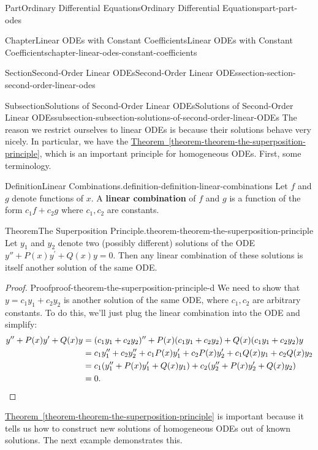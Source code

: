 \documentclass[twoside,10pt,]{book}
\newcommand{\xreffont}{\relax}
\newcommand{\terminology}[1]{\textbf{#1}}
\numberwithin{equation}{part}
\newcommand{\qedhere}{\relax}
\begin{document}
\begin{partptx}{Part}{Ordinary Differential Equations}{}{Ordinary Differential Equations}{}{}{part-part-odes}
\begin{chapterptx}{Chapter}{Linear ODEs with Constant Coefficients}{}{Linear ODEs with Constant Coefficients}{}{}{chapter-linear-odes-constant-coefficients}
\begin{sectionptx}{Section}{Second-Order Linear ODEs}{}{Second-Order Linear ODEs}{}{}{section-section-second-order-linear-odes}
\typeout{************************************************}
%
\begin{subsectionptx}{Subsection}{Solutions of Second-Order Linear ODEs}{}{Solutions of Second-Order Linear ODEs}{}{}{subsection-subsection-solutions-of-second-order-linear-ODEs}
The reason we restrict ourselves to linear ODEs is because their solutions behave very nicely. In particular, we have the \hyperref[theorem-theorem-the-superposition-principle]{Theorem~{\xreffont\ref{theorem-theorem-the-superposition-principle}}}, which is an important principle for homogeneous ODEs. First, some terminology.%
\begin{definition}{Definition}{Linear Combinations.}{definition-definition-linear-combinations}%
%
Let \(f\) and \(g\) denote functions of \(x\). A \terminology{linear combination} of \(f\) and \(g\) is a function of the form \(c_{1}f+c_{2}g\) where \(c_{1},c_{2}\) are constants.%
\end{definition}
\begin{theorem}{Theorem}{The Superposition Principle.}{}{theorem-theorem-the-superposition-principle}%
%
Let \(y_{1}\) and \(y_{2}\) denote two (possibly different) solutions of the ODE \(y''+P(x)y^\prime+Q(x)y = 0\). Then any linear combination of these solutions is itself another solution of the same ODE.%
\end{theorem}
\begin{proof}{Proof}{}{proof-theorem-the-superposition-principle-d}
We need to show that \(y = c_{1}y_{1} + c_{2}y_{2}\) is another solution of the same ODE, where \(c_{1},c_{2}\) are arbitrary constants. To do this, we'll just plug the linear combination into the ODE and simplify:%
\begin{align*}
y''+P(x)y^\prime+Q(x)y & = (c_{1}y_{1}+c_{2}y_{2})''+P(x)(c_{1}y_{1}+c_{2}y_{2})+Q(x)(c_{1}y_{1}+c_{2}y_{2})y \\
& = c_{1}y''_{1}+c_{2}y''_{2} + c_{1}P(x)y'_{1}+c_{2}P(x)y'_{2} + c_{1}Q(x)y_{1} + c_{2}Q(x)y_{2}\\
& = c_{1}(y''_{1}+P(x)y'_{1}+Q(x)y_{1}) + c_{2}(y''_{2}+P(x)y'_{2}+Q(x)y_{2}) \\
& = 0. \qedhere
\end{align*}
%
\end{proof}
\hyperref[theorem-theorem-the-superposition-principle]{Theorem~{\xreffont\ref{theorem-theorem-the-superposition-principle}}} is important because it tells us how to construct new solutions of homogeneous ODEs out of known solutions. The next example demonstrates this.%

\end{subsectionptx}
\end{sectionptx}
\end{chapterptx}
\end{partptx}
\end{document}
